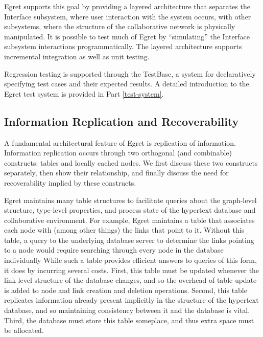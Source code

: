Egret supports this goal by providing a layered architecture that
separates the Interface subsystem, where user interaction with the
system occurs, with other subsystems, where the structure of the
collaborative network is physically manipulated.  It is possible to
test much of Egret by ``simulating'' the Interface subsystem
interactions programmatically.
The layered architecture supports incremental integration as well as
unit testing.

Regression testing is supported through the TestBase, a system for
declaratively specifying test cases and their expected results. A detailed
introduction to the Egret test system is provided in Part \ref{test-system}.

\subsection{Information Replication and Recoverability}

A fundamental architectural feature of Egret is replication of  information. 
Information replication occurs through two orthogonal (and combinable)
constructs:  tables and locally cached nodes.  We first discuss these
two constructs separately, then show their relationship, and finally
discuss the need for recoverability implied by these constructs.

Egret maintains many table structures to facilitate queries about the
graph-level structure, type-level properties, and process state of the
hypertext database and collaborative environment.   For example,  Egret
maintains a table that associates each node with (among other things) the
links that point to it.  Without this table, a query to the underlying database
server to determine the links pointing to  a node would require searching
through every node in the database individually   While such a table provides
efficient answers to queries of this form, it does by incurring several costs. 
First, this table must be updated whenever the link-level structure of the
database changes, and so the overhead of table update is added to node and
link creation and deletion operations.  Second,  this table replicates
information already present implicitly in the structure of the hypertext
database, and so maintaining consistency between it and the database is
vital.  Third, the database must store this table someplace, and thus extra
space must be allocated.

